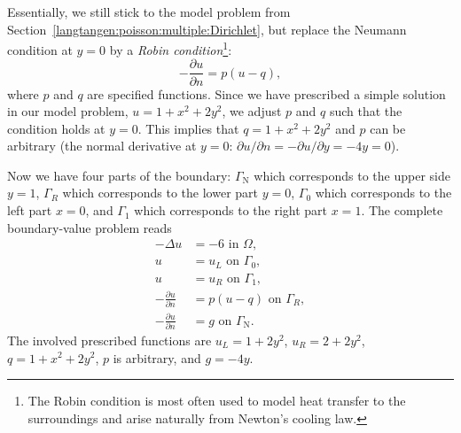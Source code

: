 Essentially, we still stick to the model problem from
Section~\ref{langtangen:poisson:multiple:Dirichlet}, but replace the
Neumann condition at $y=0$ by a \emph{Robin condition}\footnote{The Robin
condition is most often used to model heat transfer to the surroundings
and arise naturally from Newton's cooling law.}:
\begin{equation}
 - \frac{\partial u}{\partial n} = p(u-q),
\end{equation}
where $p$ and $q$ are specified functions.  Since we have prescribed
a simple solution in our model problem, $u=1+x^2+2y^2$, we adjust
$p$ and $q$ such that the condition holds at $y=0$. This implies that
$q=1+x^2+2y^2$ and $p$ can be arbitrary (the normal derivative at $y=0$:
$\partial u/\partial n = -\partial u/\partial y = -4y=0$).

Now we have four parts of the boundary: $\Gamma_{\mathrm{N}}$ which corresponds
to the upper side $y=1$, $\Gamma_R$ which corresponds to the lower part
$y=0$, $\Gamma_0$ which corresponds to the left part $x=0$, and $\Gamma_1$
which corresponds to the right part $x=1$. The complete boundary-value
problem reads
\begin{align}
  - \Delta u &= -6 \mbox{ in } \Omega,
  \label{langtangen:poisson:2D:DN3}
\\
  u &= u_L \mbox{ on } \Gamma_0,
  \label{langtangen:poisson:2D:DN3:bc1}
\\
  u &= u_R \mbox{ on } \Gamma_1,
  \label{langtangen:poisson:2D:DN3:bc2}
\\
  - \frac{\partial u}{\partial n} &= p(u-q) \mbox{ on } \Gamma_R,
  \label{langtangen:poisson:2D:DN3:bc3}
\\
  - \frac{\partial u}{\partial n} &= g \mbox{ on } \Gamma_{\mathrm{N}}.
  \label{langtangen:poisson:2D:DN3:bc4}
\end{align}
The involved prescribed functions are $u_L= 1 + 2y^2$, $u_R = 2 + 2y^2$,
$q=1+x^2+2y^2$, $p$ is arbitrary, and $g=-4y$.

